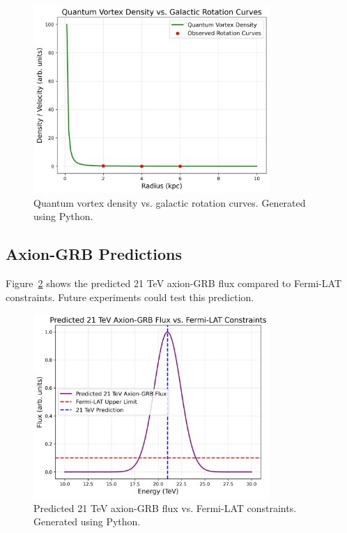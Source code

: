\documentclass[12pt, a4paper]{article}
\begin{document}
\begin{figure}[H]
\centering
\includegraphics[width=0.8\textwidth]{dm_vortices.png}
\caption{Quantum vortex density vs. galactic rotation curves. Generated using Python.}
\label{fig:dm_vortices}
\end{figure}

\subsection{Axion-GRB Predictions}
Figure~\ref{fig:axion_fermi} shows the predicted 21 TeV axion-GRB flux compared to Fermi-LAT constraints. Future experiments could test this prediction.

\begin{figure}[H]
\centering
\includegraphics[width=0.8\textwidth]{axion_fermi.png}
\caption{Predicted 21 TeV axion-GRB flux vs. Fermi-LAT constraints. Generated using Python.}
\label{fig:axion_fermi}
\end{figure}
\end{document}
